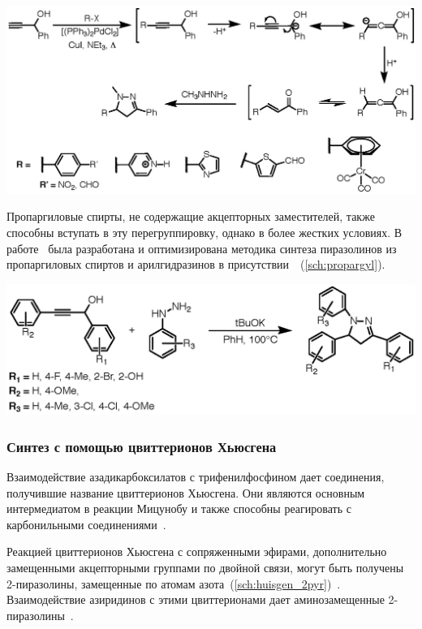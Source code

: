 \begin{scheme}[h!]
    \centering
    \includegraphics{sections/literature/img/sonogashira.eps}
    \caption{}
    \label{sch:sonogashira}
\end{scheme}

Пропаргиловые спирты, не содержащие акцепторных заместителей, также способны вступать в эту перегруппировку, однако в более жестких условиях.
В работе~\cite{Wang2014} была разработана и оптимизирована методика синтеза пиразолинов из пропаргиловых спиртов и арилгидразинов в присутствии~~(\ref{sch:propargyl}).

\begin{scheme}[h!]
    \centering
    \includegraphics{sections/literature/img/propargyl.eps}
    \caption{}
    \label{sch:propargyl}
\end{scheme}

\subsubsection{Синтез с помощью цвиттерионов Хьюсгена}
Взаимодействие азадикарбоксилатов с трифенилфосфином дает соединения, получившие название цвиттерионов Хьюсгена.
Они являются основным интермедиатом в реакции Мицунобу и также способны реагировать с карбонильными соединениями~\cite{Otte2005}.

Реакцией цвиттерионов Хьюсгена с сопряженными эфирами, дополнительно замещенными акцепторными группами по двойной связи, могут быть получены 2-пиразолины, замещенные по атомам азота~(\ref{sch:huisgen_2pyr})~\cite{Yamazaki2012}.
Взаимодействие азиридинов с этими цвиттерионами дает аминозамещенные 2-пиразолины~\cite{Cui2008}.

